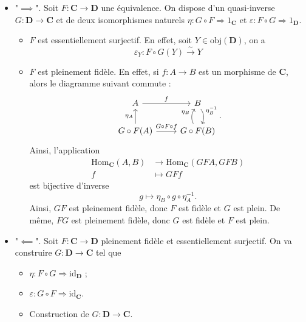 \begin{prv}
  \begin{itemize}
    \item "$\implies$". Soit $F : \mathbf{C} \to \mathbf{D}$ une équivalence.
      On dispose d'un quasi-inverse $G : \mathbf{D} \to \mathbf{C}$ et de deux isomorphismes naturels $\eta : G \circ F \Rightarrow 1_\mathbf{C}$ et $\varepsilon : F \circ G \Rightarrow 1_\mathbf{D}$.
      \begin{itemize}
        \item $F$ est essentiellement surjectif.
          En effet, soit $Y \in \mathrm{obj}(\mathbf{D})$, on a 
          \[\varepsilon_Y : F \circ G(Y) \xrightarrow{\sim} Y\]
        \item $F$ est pleinement fidèle. En effet, si $f : A \to B$ est un morphisme de $\mathbf{C}$, alors le diagramme suivant commute :
          \[
          \begin{tikzcd}
            A \arrow{r}{f} & B \arrow[bend left]{d}{\eta_B^{-1}}\\
            G \circ F(A) \arrow{u}{\eta_A} \arrow{r}{G \circ F \circ f} & G \circ F(B) \arrow[bend left]{u}{\eta_B}
          \end{tikzcd}
          .\]
          Ainsi, l'application 
          \begin{align*}
            \mathrm{Hom}_\mathbf{C}(A,B) &\longrightarrow \mathrm{Hom}_\mathbf{C}(GFA, GFB) \\
            f &\longmapsto GFf
          \end{align*}
          est bijective d'inverse \[
          g \mapsto \eta_B \circ g \circ \eta_A^{-1}
          .\]
          Ainsi, $G F$ est pleinement fidèle, donc $F$ est fidèle et $G$ est plein.
          De même, $F G$ est pleinement fidèle, donc $G$ est fidèle et $F$ est plein.
      \end{itemize}
    \item "$\impliedby$".
      Soit $F : \mathbf{C} \to \mathbf{D}$ pleinement fidèle et essentiellement surjectif.
      On va construire $G : \mathbf{D} \to \mathbf{C}$ tel que 
      \begin{itemize}
        \item $\eta : F \circ G \Rightarrow \mathrm{id}_\mathbf{D}$ ;
        \item $\varepsilon : G \circ F \Rightarrow \mathrm{id}_\mathbf{C}$.
      \end{itemize}
      \begin{itemize}
        \item Construction de $G : \mathbf{D} \to \mathbf{C}$.

\end{itemize}
\end{itemize}
\end{prv}
